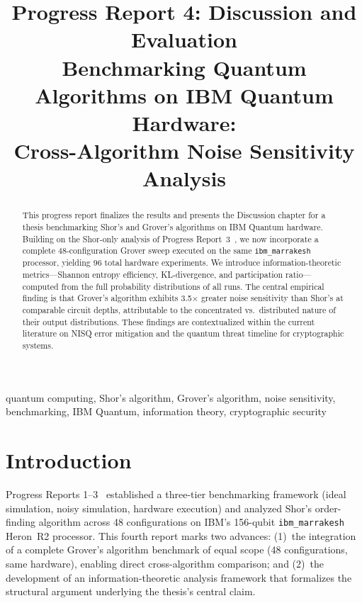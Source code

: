 \documentclass[conference]{IEEEtran}
\begin{document}
\title{Progress Report 4: Discussion and Evaluation \\
\large Benchmarking Quantum Algorithms on IBM Quantum Hardware: \\
Cross-Algorithm Noise Sensitivity Analysis}

\author{
}

\maketitle

\begin{abstract}
This progress report finalizes the results and presents the Discussion chapter for a thesis benchmarking Shor's and Grover's algorithms on IBM Quantum hardware. Building on the Shor-only analysis of Progress Report~3~\cite{b1}, we now incorporate a complete 48-configuration Grover sweep executed on the same \texttt{ibm\_marrakesh} processor, yielding 96 total hardware experiments. We introduce information-theoretic metrics---Shannon entropy efficiency, KL-divergence, and participation ratio---computed from the full probability distributions of all runs. The central empirical finding is that Grover's algorithm exhibits 3.5$\times$ greater noise sensitivity than Shor's at comparable circuit depths, attributable to the concentrated vs.\ distributed nature of their output distributions. These findings are contextualized within the current literature on NISQ error mitigation and the quantum threat timeline for cryptographic systems.
\end{abstract}

\begin{IEEEkeywords}
quantum computing, Shor's algorithm, Grover's algorithm, noise sensitivity, benchmarking, IBM Quantum, information theory, cryptographic security
\end{IEEEkeywords}

\section{Introduction}

Progress Reports 1--3~\cite{b1} established a three-tier benchmarking framework (ideal simulation, noisy simulation, hardware execution) and analyzed Shor's order-finding algorithm across 48 configurations on IBM's 156-qubit \texttt{ibm\_marrakesh} Heron~R2 processor. This fourth report marks two advances: (1)~the integration of a complete Grover's algorithm benchmark of equal scope (48 configurations, same hardware), enabling direct cross-algorithm comparison; and (2)~the development of an information-theoretic analysis framework that formalizes the structural argument underlying the thesis's central claim.
\end{document}
